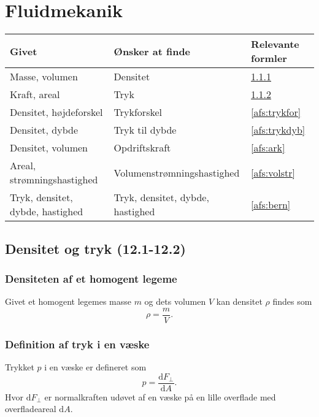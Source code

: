 \section{Fluidmekanik}

\begin{table}[ht]
\begin{tabular}{|l|l|l|}
\hline
\textbf{Givet}                   & \textbf{Ønsker at finde}         & \textbf{Relevante formler} \\ \hline
Masse, volumen                   & Densitet                         & \ref{afs:dens}             \\ \hline
Kraft, areal                     & Tryk                             & \ref{afs:trykdef}          \\ \hline
Densitet, højdeforskel           & Trykforskel                      & \ref{afs:trykfor}          \\ \hline
Densitet, dybde                  & Tryk til dybde                   & \ref{afs:trykdyb}          \\ \hline
Densitet, volumen                & Opdriftskraft                    & \ref{afs:ark}              \\ \hline
Areal, strømningshastighed       & Volumenstrømningshastighed       & \ref{afs:volstr}           \\ \hline
Tryk, densitet, dybde, hastighed & Tryk, densitet, dybde, hastighed & \ref{afs:bern}             \\ \hline
\end{tabular}
\end{table}

\subsection{Densitet og tryk (12.1-12.2)}

\subsubsection{Densiteten af et homogent legeme} \label{afs:dens}
Givet et homogent legemes masse $m$ og dets volumen $V$ kan densitet $\rho$ findes som
\[ 
\rho = \frac{m}{V}
.\]


\subsubsection{Definition af tryk i en væske} \label{afs:trykdef}
Trykket $p$ i en væske er defineret som
\[ 
p = \frac{\mathrm{d}F_{\perp}}{\mathrm{d}A} 
.\]
Hvor $\mathrm{d}F_{\perp}$ er normalkraften udøvet af en væske på en lille overflade med overfladeareal $\mathrm{d}A$.


